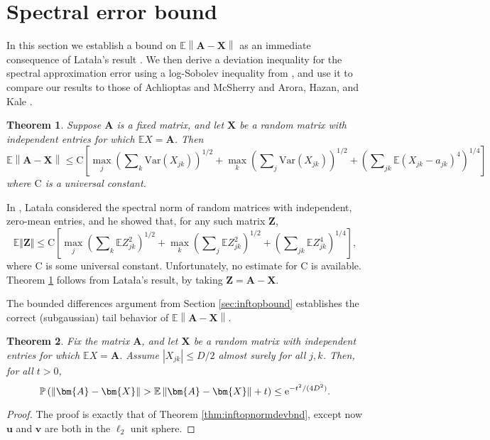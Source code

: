\documentclass[11pt,letterpaper,twoside,reqno]{amsart}
\newcommand{\e}{\ensuremath{{\rm e}}}
\newcommand{\mat}[1]{\ensuremath{\bm{#1}}}
\newcommand{\E}{\ensuremath{\mathbb{E}}}
\newcommand{\Prob}[1]{\ensuremath{\mathbb{P}\left(#1\right)}}
\newcommand{\norm}[1]{\ensuremath{\left\|#1\right\|}}
\newcommand{\var}[1]{\ensuremath{\mathrm{Var}(#1)}}
\newtheorem{thm}{Theorem}
\begin{document}
\section{Spectral error bound}

\label{sec:spectralerrbound}

In this section we establish a bound on $\E\norm{\mat{A}-\mat{X}}$ as an immediate consequence of Lata\l{}a's result \cite{Lat04}. We then derive a deviation inequality for the spectral approximation error using a log-Sobolev inequality from \cite{BLM03}, and use it to compare our results to those of Achlioptas and McSherry \cite{AM07} and Arora, Hazan, and Kale \cite{AHK06}.

\begin{thm}
Suppose $\mat{A}$ is a fixed matrix, and let $\mat{X}$ be a random matrix with independent entries for which $\E X=\mat{A}$. Then 
\[
\E\norm{\mat{A}-\mat{X}}\leq\mathrm{C}\left[\max_{j}\left(\sum\nolimits_{k}\var{X_{jk}}\right)^{1/2}+\max_{k}\left(\sum\nolimits_{j}\var{X_{jk}}\right)^{1/2}+\left(\sum\nolimits_{jk}\E(X_{jk}-a_{jk})^{4}\right)^{1/4}\right]
\]
where $\mathrm{C}$ is a universal constant.
\label{thm:spectralbound}
\end{thm}
In \cite{Lat04}, Lata\l{}a considered the spectral norm of random matrices with independent, zero-mean entries, and he showed that, for any such matrix $\mat{Z}$, 
\[
\E\Vert\mat{Z}\Vert\leq\mathrm{C}\left[\max_{j}\left(\sum\nolimits_{k}\E Z_{jk}^{2}\right)^{1/2}+\max_{k}\left(\sum\nolimits_{j}\E Z_{jk}^{2}\right)^{1/2}+\left(\sum\nolimits_{jk}\E Z_{jk}^{4}\right)^{1/4}\right],
\]
where $\mathrm{C}$ is some universal constant. Unfortunately, no estimate for $\mathrm{C}$ is available. Theorem \ref{thm:spectralbound} follows from Lata\l{}a's result, by taking $\mat{Z}=\mat{A}-\mat{X}$.

The bounded differences argument from Section \ref{sec:inftopbound} establishes the correct (subgaussian) tail behavior of $\mathbb{E}\norm{\mat{A}-\mat{X}}$.

\begin{thm}
Fix the matrix $\mat{A}$, and let $\mat{X}$ be a random matrix with independent entries for which $\E X = \mat{A}$. Assume $\left|X_{jk}\right|\leq D/2$ almost surely for all $j,k$. Then, for all $t>0$,
\[
\Prob{\norm{\mat{A}-\mat{X}}>\E\norm{\mat{A} - \mat{X}}+t}\leq \e^{-t^{2}/(4D^{2})}.
\]
\label{thm:normconcentration}
\end{thm}
\begin{proof}
The proof is exactly that of Theorem \ref{thm:inftopnormdevbnd}, except now $\mat{u}$ and $\mat{v}$ are both in the $\ell_2$ unit sphere.
\end{proof}
\end{document}
